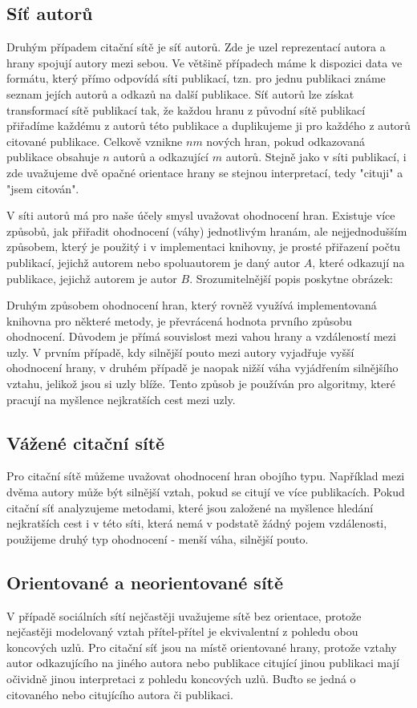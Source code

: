 \documentclass[12pt,titlepage]{report}
\begin{document}
\subsection{Síť autorů}
Druhým případem citační sítě je síť autorů. Zde je uzel reprezentací autora a
hrany spojují autory mezi sebou. Ve většině případech máme k dispozici data ve
formátu, který přímo odpovídá síti publikací, tzn. pro jednu publikaci známe
seznam jejích autorů a odkazů na další publikace. Síť autorů lze získat
transformací sítě publikací tak, že každou hranu z původní sítě publikací
přiřadíme každému z autorů této publikace a duplikujeme ji pro každého z autorů
citované publikace. Celkově vznikne $nm$ nových hran, pokud odkazovaná
publikace obsahuje $n$ autorů a odkazující $m$ autorů. Stejně jako v síti
publikací, i zde uvažujeme dvě opačné orientace hrany se stejnou interpretací,
tedy "cituji" a "jsem citován". 

V síti autorů má pro naše účely smysl uvažovat ohodnocení hran. Existuje více
způsobů, jak přiřadit ohodnocení (váhy) jednotlivým hranám, ale nejjednodušším
způsobem, který je použitý i v implementaci knihovny, je prosté přiřazení počtu
publikací, jejichž autorem nebo spoluautorem je daný autor $A$, které odkazují
na publikace, jejichž autorem je autor $B$. Srozumitelnější popis poskytne
obrázek:

Druhým způsobem ohodnocení hran, který rovněž využívá implementovaná knihovna
pro některé metody, je převrácená hodnota prvního způsobu ohodnocení. Důvodem
je přímá souvislost mezi vahou hrany a vzdáleností mezi uzly. V prvním případě,
kdy silnější pouto mezi autory vyjadřuje vyšší ohodnocení hrany, v druhém
případě je naopak nižší váha vyjádřením silnějšího vztahu, jelikož jsou si uzly
blíže. Tento způsob je používán pro algoritmy, které pracují na myšlence
nejkratších cest mezi uzly. 

\subsection{Vážené citační sítě}
Pro citační sítě můžeme uvažovat ohodnocení hran obojího typu. Například mezi
dvěma autory může být silnější vztah, pokud se citují ve více publikacích.
Pokud citační síť analyzujeme metodami, které jsou založené na myšlence hledání
nejkratších cest i v této síti, která nemá v podstatě žádný pojem vzdálenosti,
použijeme druhý typ ohodnocení - menší váha, silnější pouto.


\subsection{Orientované a neorientované sítě}
V případě sociálních sítí nejčastěji uvažujeme sítě bez orientace, protože
nejčastěji modelovaný vztah přítel-přítel je ekvivalentní z pohledu obou
koncových uzlů. Pro citační síť jsou na místě orientované hrany, protože vztahy
autor odkazujícího na jiného autora nebo publikace citující jinou publikaci
mají očividně jinou interpretaci z pohledu koncových uzlů. Buďto se jedná o
citovaného nebo citujícího autora či publikaci.
\end{document}
